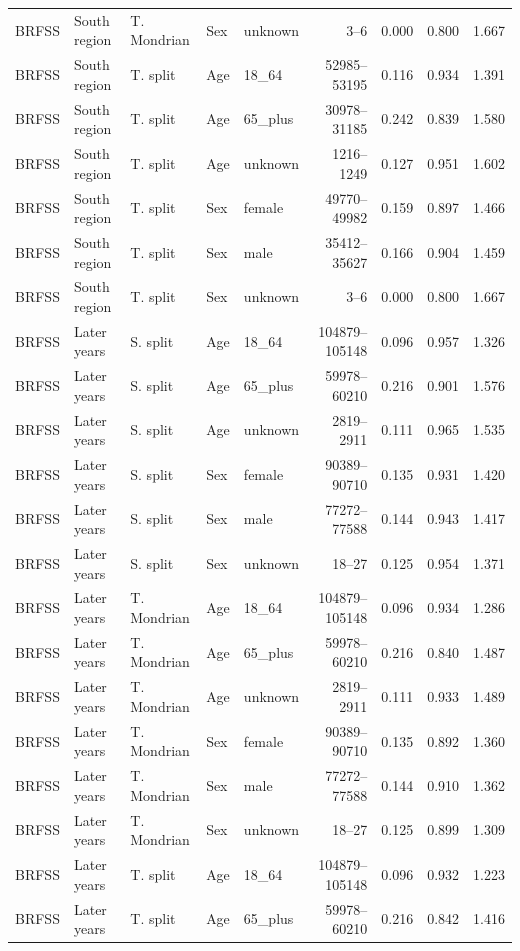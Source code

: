 \begin{longtable}{L{0.9cm}L{1.55cm}L{1.45cm}L{1.1cm}L{1.8cm}r r r r}
BRFSS & South region & T. Mondrian & Sex & unknown & 3--6 & 0.000 & 0.800 & 1.667 \\
BRFSS & South region & T. split & Age & 18\_64 & 52985--53195 & 0.116 & 0.934 & 1.391 \\
BRFSS & South region & T. split & Age & 65\_plus & 30978--31185 & 0.242 & 0.839 & 1.580 \\
BRFSS & South region & T. split & Age & unknown & 1216--1249 & 0.127 & 0.951 & 1.602 \\
BRFSS & South region & T. split & Sex & female & 49770--49982 & 0.159 & 0.897 & 1.466 \\
BRFSS & South region & T. split & Sex & male & 35412--35627 & 0.166 & 0.904 & 1.459 \\
BRFSS & South region & T. split & Sex & unknown & 3--6 & 0.000 & 0.800 & 1.667 \\
BRFSS & Later years & S. split & Age & 18\_64 & 104879--105148 & 0.096 & 0.957 & 1.326 \\
BRFSS & Later years & S. split & Age & 65\_plus & 59978--60210 & 0.216 & 0.901 & 1.576 \\
BRFSS & Later years & S. split & Age & unknown & 2819--2911 & 0.111 & 0.965 & 1.535 \\
BRFSS & Later years & S. split & Sex & female & 90389--90710 & 0.135 & 0.931 & 1.420 \\
BRFSS & Later years & S. split & Sex & male & 77272--77588 & 0.144 & 0.943 & 1.417 \\
BRFSS & Later years & S. split & Sex & unknown & 18--27 & 0.125 & 0.954 & 1.371 \\
BRFSS & Later years & T. Mondrian & Age & 18\_64 & 104879--105148 & 0.096 & 0.934 & 1.286 \\
BRFSS & Later years & T. Mondrian & Age & 65\_plus & 59978--60210 & 0.216 & 0.840 & 1.487 \\
BRFSS & Later years & T. Mondrian & Age & unknown & 2819--2911 & 0.111 & 0.933 & 1.489 \\
BRFSS & Later years & T. Mondrian & Sex & female & 90389--90710 & 0.135 & 0.892 & 1.360 \\
BRFSS & Later years & T. Mondrian & Sex & male & 77272--77588 & 0.144 & 0.910 & 1.362 \\
BRFSS & Later years & T. Mondrian & Sex & unknown & 18--27 & 0.125 & 0.899 & 1.309 \\
BRFSS & Later years & T. split & Age & 18\_64 & 104879--105148 & 0.096 & 0.932 & 1.223 \\
BRFSS & Later years & T. split & Age & 65\_plus & 59978--60210 & 0.216 & 0.842 & 1.416 \\

\end{longtable}
